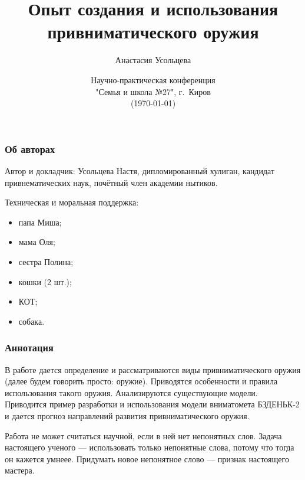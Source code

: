


\date{Научно-практическая конференция\\"Семья и школа №27", г.~Киров\\(\today)}
\author[А.~Усольцева]{Анастасия Усольцева}

\title[Привниматическое оружие]{Опыт создания и использования привниматического оружия}







\begin{frame}
    \frametitle{Об авторах}
    
    \alert{Автор и докладчик}: Усольцева Настя, дипломированный хулиган, кандидат привнематических наук, почётный член академии нытиков.
    
    \alert{Техническая и моральная поддержка}:
    \begin{itemize}
        \item папа Миша;
        \item мама Оля;
        \item сестра Полина;
        \item кошки (2 шт.);
        \item \alert{КОТ};
        \item собака.
    \end{itemize}
    
\end{frame}

\begin{frame}
    \frametitle{Аннотация}
    
    В работе дается определение и рассматриваются виды \alert{привниматического оружия} (далее будем говорить просто: оружие). Приводятся \alert{особенности и правила} использования такого оружия. Анализируются \alert{существующие модели}. Приводится пример разработки и использования модели вниматомета \alert{БЗДЕНЬК-2} и дается прогноз направлений развития привниматического оружия.
\end{frame}

Работа не может считаться научной, если в ней нет непонятных слов. Задача настоящего ученого --- использовать только непонятные слова, потому что тогда он кажется умнеее. Придумать новое непонятное слово --- признак настоящего мастера.
    
